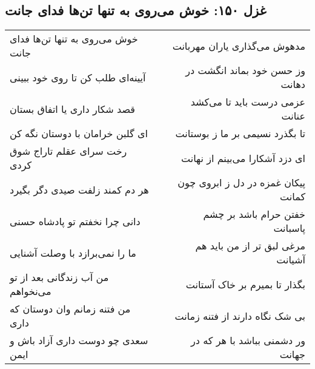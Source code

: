 \begin{center}
\section*{غزل ۱۵۰: خوش می‌روی به تنها تن‌ها فدای جانت}
\label{sec:150}
\begin{longtable}{l p{0.5cm} r}
خوش می‌روی به تنها تن‌ها فدای جانت
&&
مدهوش می‌گذاری یاران مهربانت
\\
آیینه‌ای طلب کن تا روی خود ببینی
&&
وز حسن خود بماند انگشت در دهانت
\\
قصد شکار داری یا اتفاق بستان
&&
عزمی درست باید تا می‌کشد عنانت
\\
ای گلبن خرامان با دوستان نگه کن
&&
تا بگذرد نسیمی بر ما ز بوستانت
\\
رخت سرای عقلم تاراج شوق کردی
&&
ای دزد آشکارا می‌بینم از نهانت
\\
هر دم کمند زلفت صیدی دگر بگیرد
&&
پیکان غمزه در دل ز ابروی چون کمانت
\\
دانی چرا نخفتم تو پادشاه حسنی
&&
خفتن حرام باشد بر چشم پاسبانت
\\
ما را نمی‌برازد با وصلت آشنایی
&&
مرغی لبق تر از من باید هم آشیانت
\\
من آب زندگانی بعد از تو می‌نخواهم
&&
بگذار تا بمیرم بر خاک آستانت
\\
من فتنه زمانم وان دوستان که داری
&&
بی شک نگاه دارند از فتنه زمانت
\\
سعدی چو دوست داری آزاد باش و ایمن
&&
ور دشمنی بباشد با هر که در جهانت
\\
\end{longtable}
\end{center}
